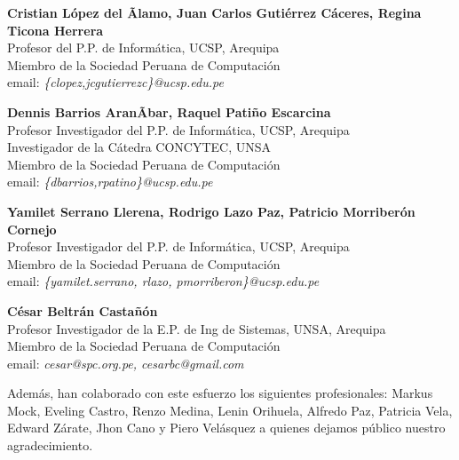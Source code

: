 \begin{center}
\textbf{Cristian López del Ãlamo, Juan Carlos Gutiérrez Cáceres, Regina Ticona Herrera}\\
Profesor del P.P. de Informática, UCSP, Arequipa\\
Miembro de la Sociedad Peruana de Computación\\
email: \textit{\{clopez,jcgutierrezc\}@ucsp.edu.pe}
\end{center}

\begin{center}
\textbf{Dennis Barrios AranÃ­bar, Raquel Patiño Escarcina}\\
Profesor Investigador del P.P. de Informática, UCSP, Arequipa\\
Investigador de la Cátedra CONCYTEC, UNSA\\
Miembro de la Sociedad Peruana de Computación\\
email: \textit{\{dbarrios,rpatino\}@ucsp.edu.pe}
\end{center}

\begin{center}
\textbf{Yamilet Serrano Llerena, Rodrigo Lazo Paz, Patricio Morriberón Cornejo}\\
Profesor Investigador del P.P. de Informática, UCSP, Arequipa\\
Miembro de la Sociedad Peruana de Computación\\
email: \textit{\{yamilet.serrano, rlazo, pmorriberon\}@ucsp.edu.pe}
\end{center}

\begin{center}
\textbf{César Beltrán Castañón}\\
Profesor Investigador de la E.P. de Ing de Sistemas, UNSA, Arequipa\\
Miembro de la Sociedad Peruana de Computación\\
email: \textit{cesar@spc.org.pe, cesarbc@gmail.com}
\end{center}

Además, han colaborado con este esfuerzo los siguientes profesionales: Markus Mock, Eveling Castro, Renzo Medina, Lenin Orihuela, Alfredo Paz, Patricia Vela, Edward Zárate, Jhon Cano y Piero Velásquez a quienes dejamos público nuestro agradecimiento.
